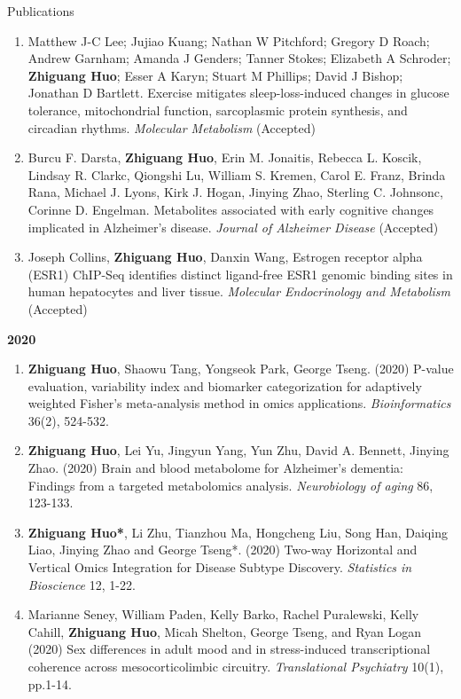 \documentclass{resume} %
\begin{document}
\begin{rSection}{Publications}
\begin{enumerate}[noitemsep,topsep=0pt, resume]
\item  
Matthew J-C Lee; Jujiao Kuang; Nathan W Pitchford; Gregory D Roach; Andrew Garnham; Amanda J Genders; Tanner Stokes; Elizabeth A Schroder; {\bf Zhiguang Huo}; Esser A Karyn; Stuart M Phillips; David J Bishop; Jonathan D Bartlett.
Exercise mitigates sleep-loss-induced changes in glucose tolerance, mitochondrial function, sarcoplasmic protein synthesis, and circadian rhythms.
\emph{Molecular Metabolism} (Accepted)


\item  
Burcu F. Darsta, {\bf Zhiguang Huo}, Erin M. Jonaitis, Rebecca L. Koscik, Lindsay R. Clarkc, Qiongshi Lu, William S. Kremen, Carol E. Franz, Brinda Rana, Michael J. Lyons, Kirk J. Hogan, Jinying Zhao, Sterling C. Johnsonc, Corinne D. Engelman.
Metabolites associated with early cognitive changes implicated in Alzheimer's disease.
\emph{Journal of Alzheimer Disease} (Accepted)


\item  Joseph Collins, {\bf Zhiguang Huo}, Danxin Wang, 
Estrogen receptor alpha (ESR1) ChIP-Seq identifies distinct ligand-free ESR1 genomic binding sites in human hepatocytes and liver tissue.
\emph{Molecular Endocrinology and Metabolism} (Accepted)


\end{enumerate}


\textbf{2020}
\begin{enumerate}[noitemsep,topsep=0pt, resume]


\item  {\bf  Zhiguang Huo}, Shaowu Tang, Yongseok Park, George Tseng. (2020) 
P-value evaluation, variability index and biomarker categorization for adaptively weighted Fisher's meta-analysis method in omics applications. 
\emph{Bioinformatics} 36(2), 524-532.

\item  {\bf Zhiguang Huo}, Lei Yu, Jingyun Yang, Yun Zhu,  David A. Bennett, Jinying Zhao. (2020)
Brain and blood metabolome for Alzheimer's dementia: Findings from a targeted metabolomics analysis.
\emph{Neurobiology of aging}  86, 123-133.

\item {\bf  Zhiguang Huo*}, Li Zhu, Tianzhou Ma, Hongcheng Liu, Song Han, Daiqing Liao, Jinying Zhao and George Tseng*.  (2020)
Two-way Horizontal and Vertical Omics Integration for Disease Subtype Discovery. \emph{Statistics in Bioscience} 12, 1-22.

\item 
Marianne Seney, William Paden, Kelly Barko, Rachel Puralewski, Kelly Cahill, {\bf Zhiguang Huo}, Micah Shelton, George Tseng, and Ryan Logan
(2020)
Sex differences in adult mood and in stress-induced transcriptional coherence across mesocorticolimbic circuitry.
\emph{Translational Psychiatry}  10(1), pp.1-14.


\end{enumerate}
\end{rSection}
\end{document}
